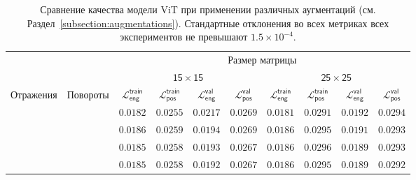 \documentclass[a4paper,12pt]{extarticle}
\newcommand{\cmark}{\ding{51}}
\newcommand{\xmark}{\ding{55}}
\begin{document}
\begin{table}[t]
	\footnotesize
	\centering
	\begin{tabular}{cc|cccc|cccc}
		\toprule
		{} & {} & \multicolumn{8}{c}{\textsf{Размер матрицы}} \\
		\cmidrule(lr){3-10}
        {} & {} & \multicolumn{4}{c}{$\mathsf{15 \times 15}$} \vline & \multicolumn{4}{c}{$\mathsf{25 \times 25}$} \\
		\midrule
        \textsf{Отражения} & \textsf{Повороты} & $\mathcal{L}_{\mathsf{eng}}^{\mathsf{train}}$ & $\mathcal{L}_{\mathsf{pos}}^{\mathsf{train}}$ & $\mathcal{L}_{\mathsf{eng}}^{\mathsf{val}}$ & $\mathcal{L}_{\mathsf{pos}}^{\mathsf{val}}$ & $\mathcal{L}_{\mathsf{eng}}^{\mathsf{train}}$ & $\mathcal{L}_{\mathsf{pos}}^{\mathsf{train}}$ & $\mathcal{L}_{\mathsf{eng}}^{\mathsf{val}}$ & $\mathcal{L}_{\mathsf{pos}}^{\mathsf{val}}$ \\
        \midrule
        \xmark & \xmark & $\mathsf{0.0182}$ & $\mathsf{0.0255}$ & $\mathsf{0.0217}$ & $\mathsf{0.0269}$ & $\mathsf{0.0181}$ & $\mathsf{0.0291}$ & $\mathsf{0.0192}$ & $\mathsf{0.0294}$ \\
        \cmark & \xmark & $\mathsf{0.0186}$ & $\mathsf{0.0259}$ & $\mathsf{0.0194}$ & $\mathsf{0.0269}$ & $\mathsf{0.0186}$ & $\mathsf{0.0295}$ & $\mathsf{0.0191}$ & $\mathsf{0.0293}$ \\
        \xmark & \cmark & $\mathsf{0.0185}$ & $\mathsf{0.0258}$ & $\mathsf{0.0193}$ & $\mathsf{0.0267}$ & $\mathsf{0.0186}$ & $\mathsf{0.0296}$ & $\mathsf{0.0189}$ & $\mathsf{0.0293}$ \\
        \cmark & \cmark & $\mathsf{0.0185}$ & $\mathsf{0.0258}$ & $\mathsf{0.0192}$ & $\mathsf{0.0267}$ & $\mathsf{0.0186}$ & $\mathsf{0.0295}$ & $\mathsf{0.0189}$ & $\mathsf{0.0292}$ \\
        
		\bottomrule
	\end{tabular}
    \caption{Сравнение качества модели \textsf{ViT} при применении различных аугментаций (см. Раздел~\ref{subsection:augmentations}). Стандартные отклонения во всех метриках всех экспериментов не превышают $1.5 \times 10^{-4}$.}
	\label{table:augmentations}
\end{table}
\end{document}
